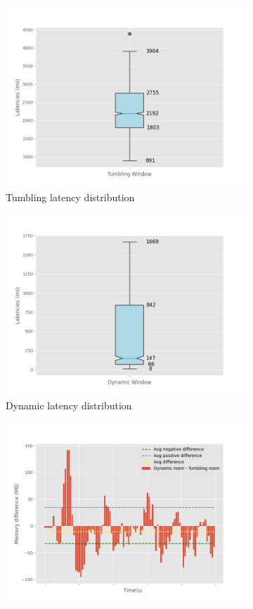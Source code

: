 \begin{figure}
\begin{subfigure}[b]{0.5\columnwidth}
        \includegraphics[width=\columnwidth]{fig/periodic/TumblingWindow_latency_boxplot.png}
        \caption{Tumbling latency distribution}
        \label{fig:periodic_tumb_boxplot}
    \end{subfigure}
    \hfill 
    \begin{subfigure}[b]{0.5\columnwidth}
        \includegraphics[width=\columnwidth]{fig/periodic/DynamicWindow_latency_boxplot.png}
        \caption{Dynamic latency distribution}
        \label{fig:periodic_dynamic_boxplot}
    \end{subfigure}
    \begin{subfigure}[b]{\columnwidth}
        \centering
        \includegraphics[width=0.5\columnwidth]{fig/periodic/mem_difference_bar.png}

\end{subfigure}
\end{figure}
